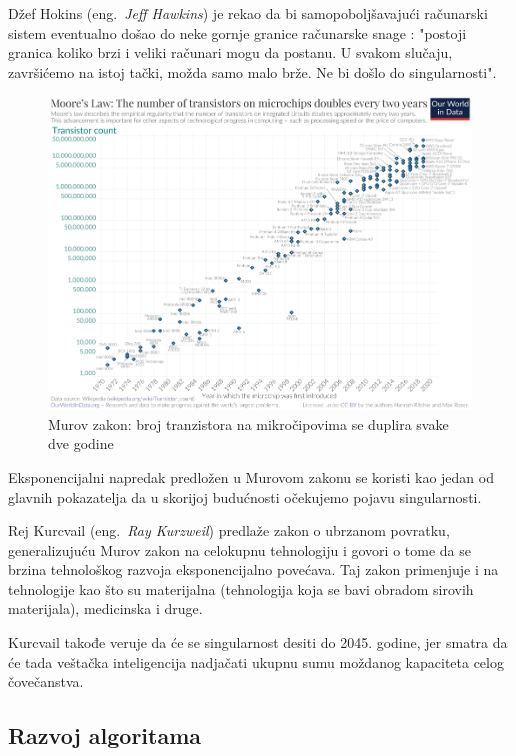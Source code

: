 \documentclass[a4paper]{article}
\begin{document}
Džef Hokins (eng.~{\em Jeff Hawkins}) je rekao da bi samopoboljšavajući računarski sistem eventualno došao do neke gornje granice računarske snage : "postoji granica koliko brzi i veliki računari mogu da postanu. U svakom slučaju, završićemo na istoj tački, možda samo malo brže. Ne bi došlo do singularnosti". \cite{mog-5}

\begin{figure}[h!]
\begin{center}
\includegraphics[scale=0.35]{moore.png}
\end{center}
\caption{Murov zakon: broj tranzistora na mikročipovima se duplira svake dve godine}
\label{fig:grafik}
\end{figure}

Eksponencijalni napredak predložen u Murovom zakonu se koristi kao jedan od glavnih pokazatelja da u skorijoj budućnosti očekujemo pojavu singularnosti.

Rej Kurcvail (eng.~{\em Ray Kurzweil}) predlaže zakon o ubrzanom povratku, generalizujuću Murov zakon na celokupnu tehnologiju i govori o tome da se brzina tehnološkog razvoja eksponencijalno povećava. Taj zakon primenjuje i na tehnologije kao što su materijalna (tehnologija koja se bavi obradom sirovih materijala), medicinska i druge.

Kurcvail takođe veruje da će se singularnost desiti do 2045. godine, jer smatra da će tada veštačka inteligencija nadjačati ukupnu sumu moždanog kapaciteta celog čovečanstva.


\subsection{Razvoj algoritama}
\end{document}
